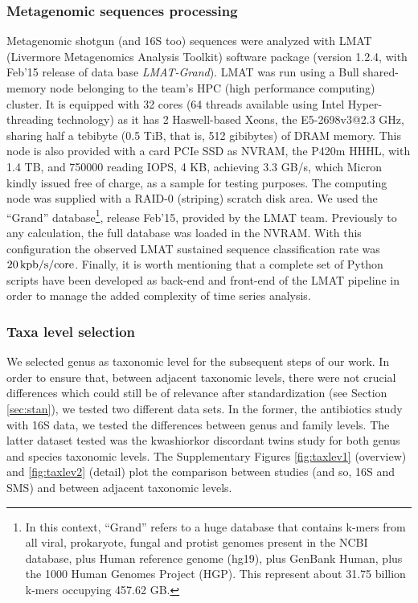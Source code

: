 \subsubsection*{Metagenomic sequences processing}
Metagenomic shotgun (and 16S too) sequences were analyzed with LMAT (Livermore Metagenomics Analysis Toolkit) software package\cite{LMAT} (version 1.2.4, with Feb'15 release of data base \emph{LMAT-Grand}). LMAT was run using a Bull shared-memory node belonging to the team's HPC (high performance computing) cluster. It is equipped with 32 cores (64 threads available using Intel Hyper-threading technology) as it has 2 Haswell-based Xeons, the E5-2698v3@2.3 GHz, sharing half a tebibyte (0.5 TiB, that is, 512 gibibytes) of DRAM memory. This node is also provided with a card PCIe SSD as NVRAM, the P420m HHHL, with 1.4 TB, and 750000 reading IOPS, 4 KB, achieving 3.3 GB/s, which Micron kindly issued free of charge, as a sample for testing purposes. The computing node was supplied with a RAID-0 (striping) scratch disk area. We used the ``Grand'' database\footnote{In this context, ``Grand'' refers to a huge database that contains k-mers from all viral, prokaryote, fungal and protist genomes present in the NCBI database, plus Human reference genome (hg19), plus GenBank Human, plus the 1000 Human Genomes Project (HGP). This represent about 31.75 billion k-mers occupying 457.62 GB.}, release Feb'15, provided by the LMAT team. Previously to any calculation, the full database was loaded in the NVRAM. With this configuration the observed LMAT sustained sequence classification rate was $20\operatorname{kpb/s/core}$. Finally, it is worth mentioning that a complete set of Python scripts have been developed as back-end and front-end of the LMAT pipeline in order to manage the added complexity of time series analysis. 

\subsubsection*{Taxa level selection}
We selected genus as taxonomic level for the subsequent steps of our work. In order to ensure that, between adjacent taxonomic levels, there were not crucial differences which could still be of relevance after standardization (see Section \ref{sec:stan}), we tested two different data sets. In the former, the antibiotics study\cite{antibiotic} with 16S data, we tested the differences between genus and family levels. The latter dataset tested was the kwashiorkor discordant twins study\cite{kwashiorkor} for both genus and species taxonomic levels. The Supplementary Figures \ref{fig:taxlev1} (overview) and \ref{fig:taxlev2} (detail) plot the comparison between studies (and so, 16S and SMS) and between adjacent taxonomic levels.

